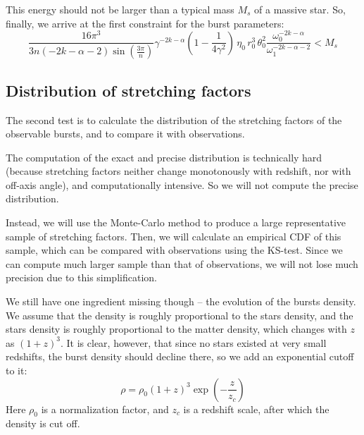 \documentclass{article}
\begin{document}
This energy should not be larger than a typical mass $M_s$ of a massive star. So, finally, we arrive at the first constraint for the burst parameters:
\begin{equation}
\frac{16\pi^3}{3 n\left(-2k-\alpha-2\right)\sin\left(\frac{3\pi}{n}\right)} \gamma^{-2k-\alpha} \left(1 - \frac{1}{4\gamma^2}\right) \, \eta_0 \, r_0^3 \, \theta_0^2 \frac{\omega_0^{-2k-\alpha}}{\omega_1^{-2k-\alpha-2}} < M_s
\end{equation}

\subsection{Distribution of stretching factors}

The second test is to calculate the distribution of the stretching factors of the observable bursts, and to compare it with observations.

The computation of the exact and precise distribution is technically hard (because stretching factors neither change monotonously with redshift, nor with off-axis angle), and computationally intensive. So we will not compute the precise distribution.

Instead, we will use the Monte-Carlo method to produce a large representative sample of stretching factors. Then, we will calculate an empirical CDF of this sample, which can be compared with observations using the KS-test. Since we can compute much larger sample than that of observations, we will not lose much precision due to this simplification.

We still have one ingredient missing though -- the evolution of the bursts density. We assume that the density is roughly proportional to the stars density, and the stars density is roughly proportional to the matter density, which changes with $z$ as $\left(1+z\right)^3$. It is clear, however, that since no stars existed at very small redshifts, the burst density should decline there, so we add an exponential cutoff to it:
\begin{equation}
\rho = \rho_0 \left(1+z\right)^3 \exp\left(-\frac{z}{z_c}\right)
\end{equation}
Here $\rho_0$ is a normalization factor, and $z_c$ is a redshift scale, after which the density is cut off.
\end{document}
